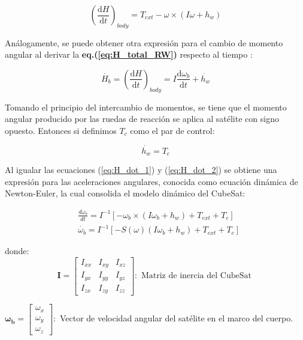   \begin{equation}\label{eq:H_dot_1}
 	 \left(\frac{\mathrm{d} H}{\mathrm{d} t}\right)_{body} = T_{ext}-\omega \times \left(I\omega + h_w\right) 	
 \end{equation}
 
 Análogamente, se puede obtener otra expresión para el cambio de momento angular al derivar la \textbf{eq.(\ref{eq:H_total_RW})} respecto al tiempo :
 
 \begin{equation}\label{eq:H_dot_2}
 	\dot{H_b} = \left(\frac{\mathrm{d} H}{\mathrm{d} t}\right)_{body} = 
 	I\frac{\mathrm{d} \omega_b}{\mathrm{d} t} + \dot{h_w}  	
 \end{equation}
 
Tomando el principio del intercambio de momentos, se tiene que el momento angular producido por las ruedas de reacción se aplica al satélite con signo opuesto. Entonces si definimos $T_c$ como el par de control:

\begin{equation}\label{eq:torque_h}
	\dot{h_w} = T_c  	
\end{equation}

Al igualar las ecuaciones (\ref{eq:H_dot_1}) y (\ref{eq:H_dot_2}) se obtiene una expresión para las aceleraciones angulares, conocida como ecuación dinámica de Newton-Euler, la cual consolida el modelo dinámico del CubeSat:


\begin{equation}\label{eq:modelo_dinamico}
	\begin{aligned}
		& \frac{d \omega_b}{d t}=I^{-1}\left[-\omega_b \times\left(I \omega_b+h_w\right)+T_{ext}+T_c\right]\\[10pt]
		& \dot{\omega_b}=I^{-1}\left[-S(\omega)\left(I \omega_b+h_w\right)+T_{ext}+T_c\right]
	\end{aligned}
\end{equation}

donde:
$$
\mathbf{I}=\left[\begin{array}{ccc}
	I_{x x} & I_{x y} & I_{x z} \\
	I_{y x} & I_{y y} & I_{y z} \\
	I_{z x} & I_{z y} & I_{z z}
\end{array}\right]:\text { Matriz de inercia del CubeSat }
$$

$\mathbf{\omega_b}=\left[\begin{array}{l}\omega_x \\ \omega_y \\ \omega_z\end{array}\right]:$ Vector de velocidad angular del satélite en el marco del cuerpo.\\[5pt]	

